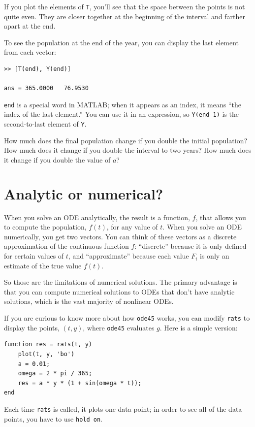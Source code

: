 \documentclass{book}
\begin{document}
If you plot the elements of {\tt T}, you'll see that the
space between the points is not quite even.  They are closer
together at the beginning of the interval and farther apart at the end.

To see the population at the end of the year, you can display the
last element from each vector:

\begin{verbatim}
>> [T(end), Y(end)]

ans = 365.0000   76.9530
\end{verbatim}

{\tt end} is a special word in MATLAB; when it appears as an index,
it means ``the index of the last element.''  You can use it in an
expression, so {\tt Y(end-1)} is the second-to-last element of
{\tt Y}.

How much does the final population change if you double the initial
population?  How much does it change if you double the interval
to two years?  How much does it change if you double the value
of $a$?


\section{Analytic or numerical?}

When you solve an ODE analytically, the result is a function, $f$,
that allows you to compute the population, $f(t)$, for any value of
$t$.  When you solve an ODE numerically, you get two vectors.  You can
think of these vectors as a discrete approximation of the continuous
function $f$: ``discrete'' because it is only defined for certain
values of $t$, and ``approximate'' because each value $F_i$
is only an estimate of the true value $f(t)$.

So those are the limitations of numerical solutions.  The primary
advantage is that you can compute numerical solutions to ODEs that
don't have analytic solutions, which is the vast majority
of nonlinear ODEs.

If you are curious to know more about how {\tt ode45} works, you
can modify {\tt rats} to display the points, $(t, y)$, where
{\tt ode45} evaluates $g$.  Here is a simple version:

\begin{verbatim}
function res = rats(t, y)
    plot(t, y, 'bo')
    a = 0.01;
    omega = 2 * pi / 365;
    res = a * y * (1 + sin(omega * t));
end
\end{verbatim}

Each time {\tt rats} is called, it plots one data point; in order
to see all of the data points, you have to use {\tt hold on}.
\end{document}
